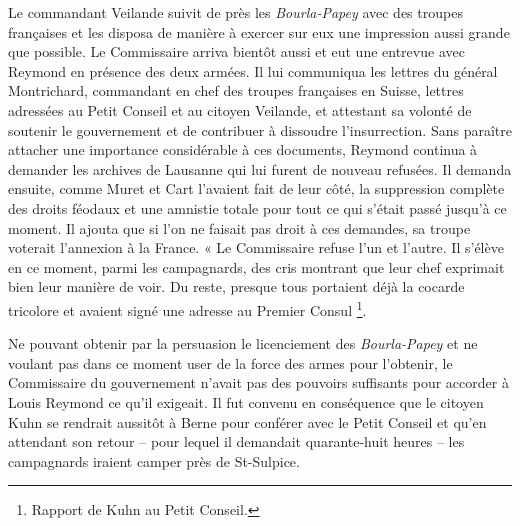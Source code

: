 \documentclass[french,twoside]{book} %
\begin{document}
Le commandant Veilande suivit de près les \emph{Bourla-Papey} avec des troupes françaises et les disposa de manière à exercer sur eux une impression aussi grande que possible. Le Commissaire arriva bientôt aussi et eut une entrevue avec Reymond en présence des deux armées. Il lui communiqua les lettres du général Montrichard, commandant en chef des troupes françaises en Suisse, lettres adressées au Petit Conseil et au citoyen Veilande, et attestant sa volonté de soutenir le gouvernement et de contribuer à dissoudre l’insurrection. Sans paraître attacher une importance considérable à ces documents, Reymond continua à demander les archives de Lausanne qui lui furent de nouveau refusées. Il demanda ensuite, comme Muret et Cart l’avaient fait de leur côté, la suppression complète des droits féodaux et une amnistie totale pour tout ce qui s’était passé jusqu’à ce moment. Il ajouta que si l’on ne faisait pas droit à ces demandes, sa troupe voterait l’annexion à la France. « Le Commissaire refuse l’un et l’autre. Il s’élève en ce moment, parmi les campagnards, des cris montrant que leur chef exprimait bien leur manière de voir. Du reste, presque tous portaient déjà la cocarde tricolore et avaient signé une adresse au Premier Consul \footnote{Rapport de Kuhn au Petit Conseil.}.\par
Ne pouvant obtenir par la persuasion le licenciement des \emph{Bourla-Papey} et ne voulant pas dans ce moment user de la force des armes pour l’obtenir, le Commissaire du gouvernement n’avait pas des pouvoirs suffisants pour accorder à Louis Reymond ce qu’il exigeait. Il fut convenu en conséquence que le citoyen Kuhn se rendrait aussitôt à Berne pour conférer avec le Petit Conseil et qu’en attendant son retour – pour lequel il demandait quarante-huit heures – les campagnards iraient camper près de St-Sulpice.
\end{document}
